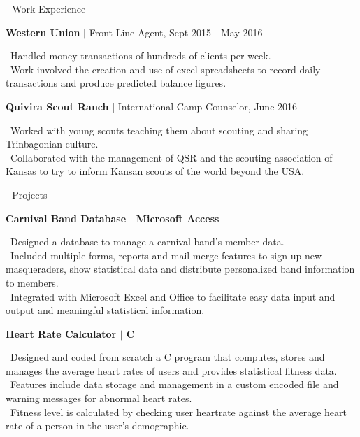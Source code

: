 \documentclass{article}
\begin{document}
\begin{minipage}[t]{0.63\textwidth}

{\LARGE\sc - Work Experience -} \smallskip\par
{\large\sffamily\bf Western Union} $|$
{\small\sffamily\lsstyle Front Line Agent, Sept 2015 - May 2016} \par
{\selectfont\textbullet\ Handled money transactions of hundreds of clients per week.\\
\textbullet\ Work involved the creation and use of excel spreadsheets to record daily transactions and produce predicted balance figures.}
\smallskip

{\large\sffamily\bf Quivira Scout Ranch} $|$
{\small\sffamily\lsstyle International Camp Counselor, June 2016} \par
{\selectfont\textbullet\  Worked with young scouts teaching them about scouting and sharing Trinbagonian culture.\\\textbullet\  Collaborated with the management of QSR and the scouting association of Kansas to try to inform Kansan scouts of the world beyond the USA.} \par
\bigskip

{\LARGE\sc - Projects -} \smallskip\par
{\sffamily\bf\small {\large Carnival Band Database $|$} Microsoft Access}\par
{\small{}\selectfont\textbullet\ Designed a database to manage a carnival band's member data.\\
\textbullet\ Included multiple forms, reports and mail merge features to sign up new masqueraders, show statistical data and distribute personalized band information to members.\\
\textbullet\ Integrated with Microsoft Excel and Office to facilitate easy data input and output and meaningful statistical information.}\par
\medskip

{\sffamily\bf\small {\large Heart Rate Calculator $|$} C}\par
{\small{}\selectfont\textbullet\ Designed and coded from scratch a C program that computes, stores and manages the average heart rates of users and provides statistical fitness data. \\
\textbullet\ Features include data storage and management in a custom encoded file and warning messages for abnormal heart rates.\\
\textbullet\ Fitness level is calculated by checking user heartrate against the average heart rate of a person in the user's demographic.}\par
\medskip


\end{minipage}
\end{document}
